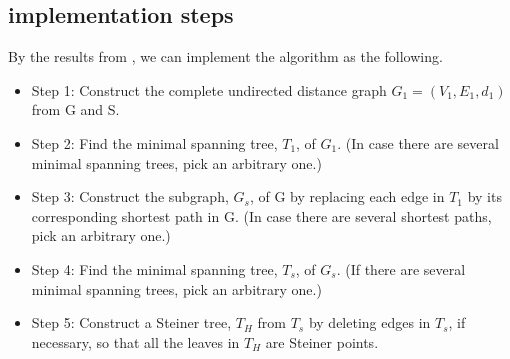 \documentclass[letterpaper,11pt,twocolumn]{article}
\begin{document}
\subsection{implementation steps}
By the results from \cite{main}, we can implement the algorithm as the following.
\begin{itemize}
    \item Step 1: Construct the complete undirected distance graph $G_1 = (V_1, E_1, d_1)$ from G and S.
    \item Step 2: Find the minimal spanning tree, $T_1$, of $G_1$. (In case there are several minimal spanning trees, pick an arbitrary one.)
    \item Step 3: Construct the subgraph, $G_s$, of G by replacing each edge in $T_1$ by its corresponding shortest path in G. (In case there are several shortest paths, pick an arbitrary one.)
    \item Step 4: Find the minimal spanning tree, $T_s$, of $G_s$. (If there are several minimal spanning trees, pick an arbitrary one.)
    \item Step 5: Construct a Steiner tree, $T_H$ from $T_s$ by deleting edges in $T_s$, if necessary, so that all the leaves in $T_H$ are Steiner points.
\end{itemize}
\end{document}
